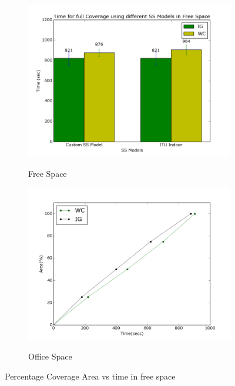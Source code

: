 \begin{figure}[!h]
\centering
	\begin{subfigure}[b]{0.75\textwidth}
		\includegraphics[width=\textwidth]{images/full_ct.png}
		\label{subfig:a}
		\caption{Free Space}
	\end{subfigure}
	\begin{subfigure}[b]{0.75\textwidth}
		\includegraphics[width=\textwidth]{images/freespace.png}
		\label{subfig:b}
		\caption{Office Space}
	\end{subfigure}
\caption{Percentage Coverage Area vs time in free space}
\end{figure}

